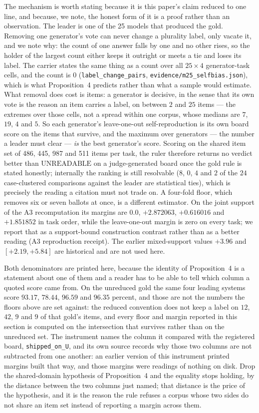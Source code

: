 \documentclass{article}
\newcommand{\ids}[1]{\texttt{\small #1}} %
\begin{document}
The mechanism is worth stating because it is this paper's claim reduced to one line, and because, we note,
the honest form of it is a proof rather than an observation. The leader is one of the 25 models that produced the gold.
Removing one generator's vote can never change a plurality label, only vacate it, and we note why: the count of one answer
falls by one and no other rises, so the holder of the largest count either keeps it outright or meets a tie
and loses its label. The carrier states the same thing as a count over all $25\times4$ generator-task cells,
and the count is $0$ (\texttt{label\_change\_pairs}, \ids{evidence/m25\_selfbias.json}), which is what
Proposition~4 predicts rather than what a sample would estimate. What removal does cost is items: a generator
is decisive, in the sense that its own vote is the reason an item carries a label, on between $2$ and $25$
items --- the extremes over those cells, not a spread within one corpus, whose medians are $7$, $19$, $4$ and
$5$. So each generator's leave-one-out self-reproduction is its own board score on the items that survive,
and the maximum over generators --- the number a leader must clear --- \emph{is} the best generator's score.
Scoring on the shared item set of 486, 445, 987 and 511 items per task, the ruler therefore returns no verdict
better than $\mathrm{UNREADABLE}$ on a judge-generated board once the gold rule is stated honestly; internally
the ranking is still resolvable ($8$, $0$, $4$ and $2$ of the $24$ case-clustered comparisons against the leader
are statistical ties), which is precisely the reading a citation must not trade on. A four-fold floor, which removes six or seven ballots at once, is a different estimator. On the joint support of the A3 recomputation its margins are $0.0$, $+2.872063$, $+0.616016$ and $+1.851852$ in task order, while the leave-one-out margin is zero on every task; we report that as a support-bound construction contrast rather than as a better reading (A3 reproduction receipt). The earlier mixed-support values $+3.96$ and $[+2.19,+5.84]$ are historical and are not used here.

Both denominators are printed here, because the identity of Proposition~4 is a statement about one of them and a reader has to be able to tell which column a quoted score came from. On the unreduced gold the same four leading systems score $93.17$, $78.44$, $96.59$ and $96.35$
percent, and those are not the numbers the floors above are set against: the reduced convention does not keep a label on $12$, $42$, $9$ and
$9$ of that gold's items, and every floor and margin reported in this section is computed on the intersection that survives rather than on
the unreduced set. The instrument names the column it compared with the registered board, \texttt{shipped\_on\_U}, and its own source records
why those two columns are not subtracted from one another: an earlier version of this instrument printed margins built that way, and those
margins were readings of nothing on disk. Drop the shared-domain hypothesis of Proposition~4 and the equality stops holding, by the distance
between the two columns just named; that distance is the price of the hypothesis, and it is the reason the rule refuses a corpus whose two
sides do not share an item set instead of reporting a margin across them.
\end{document}
